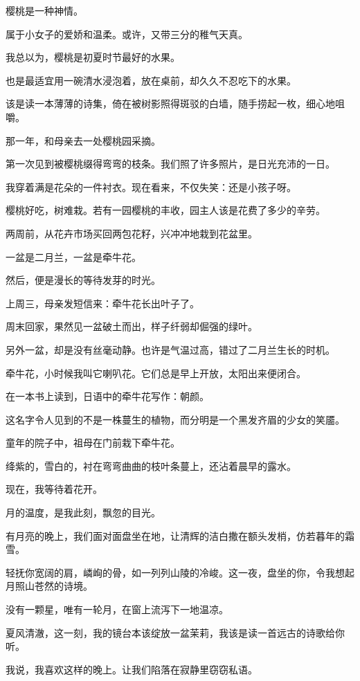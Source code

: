 \documentclass[12pt,a4paper]{article}
\def\blankrev{\vspace{1ex}}									%
\begin{document}
		\blankrev
		樱桃是一种神情。\par
		属于小女子的爱娇和温柔。或许，又带三分的稚气天真。\par
		我总以为，樱桃是初夏时节最好的水果。\par
		也是最适宜用一碗清水浸泡着，放在桌前，却久久不忍吃下的水果。\par
		该是读一本薄薄的诗集，倚在被树影照得斑驳的白墙，随手捞起一枚，细心地咀嚼。\par
		那一年，和母亲去一处樱桃园采摘。\par
		第一次见到被樱桃缀得弯弯的枝条。我们照了许多照片，是日光充沛的一日。\par
		我穿着满是花朵的一件衬衣。现在看来，不仅失笑：还是小孩子呀。\par
		樱桃好吃，树难栽。若有一园樱桃的丰收，园主人该是花费了多少的辛劳。

		\blankrev
		两周前，从花卉市场买回两包花籽，兴冲冲地栽到花盆里。\par
		一盆是二月兰，一盆是牵牛花。\par
		然后，便是漫长的等待发芽的时光。\par
		上周三，母亲发短信来：牵牛花长出叶子了。\par
		周末回家，果然见一盆破土而出，样子纤弱却倔强的绿叶。\par
		另外一盆，却是没有丝毫动静。也许是气温过高，错过了二月兰生长的时机。\par
		牵牛花，小时候我叫它喇叭花。它们总是早上开放，太阳出来便闭合。\par
		在一本书上读到，日语中的牵牛花写作：朝颜。\par
		这名字令人见到的不是一株蔓生的植物，而分明是一个黑发齐眉的少女的笑靥。\par
		童年的院子中，祖母在门前栽下牵牛花。\par
		绛紫的，雪白的，衬在弯弯曲曲的枝叶条蔓上，还沾着晨早的露水。\par
		现在，我等待着花开。

	\endwriting



		月的温度，是我此刻，飘忽的目光。


		\blankrev
		有月亮的晚上，我们面对面盘坐在地，让清辉的洁白撒在额头发梢，仿若暮年的霜雪。\par
		轻抚你宽阔的肩，嶙峋的骨，如一列列山陵的冷峻。这一夜，盘坐的你，令我想起月照山苍然的诗境。\par
		没有一颗星，唯有一轮月，在窗上流泻下一地温凉。\par
		夏风清澈，这一刻，我的镜台本该绽放一盆茉莉，我该是读一首远古的诗歌给你听。\par
		我说，我喜欢这样的晚上。让我们陷落在寂静里窃窃私语。
\end{document}

